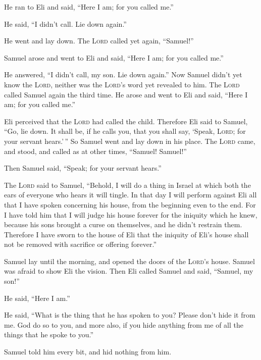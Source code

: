  He ran to Eli and said, ``Here I am; for you called me.''

He said, ``I didn't call. Lie down again.''

He went and lay down.  The \textsc{Lord} called yet again,
``Samuel!''

Samuel arose and went to Eli and said, ``Here I am; for you called me.''

He answered, ``I didn't call, my son. Lie down again.'' 
Now Samuel didn't yet know the \textsc{Lord}, neither was the
\textsc{Lord}'s word yet revealed to him.  The
\textsc{Lord} called Samuel again the third time. He arose and went to
Eli and said, ``Here I am; for you called me.''

Eli perceived that the \textsc{Lord} had called the child.
 Therefore Eli said to Samuel, ``Go, lie down. It shall
be, if he calls you, that you shall say, `Speak, \textsc{Lord}; for your
servant hears.'\,'' So Samuel went and lay down in his place.
 The \textsc{Lord} came, and stood, and called as at
other times, ``Samuel! Samuel!''

Then Samuel said, ``Speak; for your servant hears.''

 The \textsc{Lord} said to Samuel, ``Behold, I will do a
thing in Israel at which both the ears of everyone who hears it will
tingle.  In that day I will perform against Eli all that
I have spoken concerning his house, from the beginning even to the end.
 For I have told him that I will judge his house forever
for the iniquity which he knew, because his sons brought a curse on
themselves, and he didn't restrain them.  Therefore I
have sworn to the house of Eli that the iniquity of Eli's house shall
not be removed with sacrifice or offering forever.''

 Samuel lay until the morning, and opened the doors of
the \textsc{Lord}'s house. Samuel was afraid to show Eli the vision.
 Then Eli called Samuel and said, ``Samuel, my son!''

He said, ``Here I am.''

 He said, ``What is the thing that he has spoken to you?
Please don't hide it from me. God do so to you, and more also, if you
hide anything from me of all the things that he spoke to you.''

 Samuel told him every bit, and hid nothing from him.

